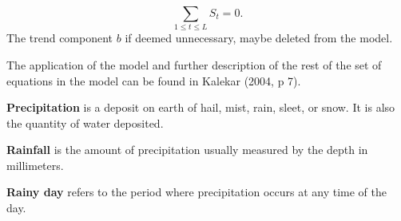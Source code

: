 \begin{equation}
\sum_{1\le t\le L} S_t = 0.
\end{equation}
The trend component $b$ if deemed unnecessary, maybe deleted from the model.

The application of the model and further description of the rest of the set of equations in the model can be found in Kalekar (2004, p 7).

\textbf{Precipitation} is a deposit on earth of hail, mist, rain, sleet, or snow. It is also the quantity of water deposited.

\textbf{Rainfall} is the amount of precipitation usually measured by the depth in millimeters.

\textbf{Rainy day} refers to the period where precipitation occurs at any time of the day.